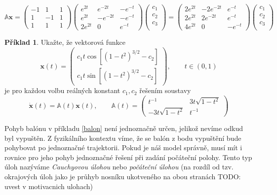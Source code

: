 \documentclass[a4paper, 12pt]{book}
\theoremstyle{definition}
\newtheorem{example}[theorem]{Příklad}
\def\vc#1{\mathbf{\boldsymbol{#1}}}     %
\def\tn#1{{\mathbb{#1}}}    %
\def\todo#1{{\color{green}TODO:} #1}
\begin{document}
\[
 \tn A\vc x =
 \begin{pmatrix}
  -1 & 1 &1\\
  1 &-1 &1\\
  1 &1 &1
 \end{pmatrix}
\begin{pmatrix}
e^{2t} &  e^{-2t}  & -  e^{-t}\\
e^{2t} &  -e^{-2t} & -  e^{-t}\\
2e^{2t} &  0        &    e^{-t}
\end{pmatrix}
\begin{pmatrix}
c_1\\
c_2\\
c_3\\
\end{pmatrix}
=
\begin{pmatrix}
2e^{2t} & -2 e^{-2t} & e^{-t}\\
2e^{2t} &  2 e^{-2t} & e^{-t}\\
4e^{2t} & 0          & -e^{-t}
\end{pmatrix}
\begin{pmatrix}
c_1\\
c_2\\
c_3\\
\end{pmatrix}
\]

\begin{example}
Ukažte, že vektorová funkce
\[
\vc x(t) = \begin{pmatrix}
c_1 t \cos [(1-t^2)^{3/2}-c_2]\\
c_1 t \sin [(1-t^2)^{3/2}-c_2]
\end{pmatrix}, \qquad t\in(0, 1)
\]
je pro každou volbu reálných konstant $c_1, c_2$ řešením soustavy
\[
\dot{\vc x}(t) = \tn A(t) \vc x(t),\qquad
\tn A(t)=\begin{pmatrix}
t^{-1}  &  3t\sqrt{1-t^2}\\
-3t\sqrt{1-t^2} & t^{-1}
\end{pmatrix}
\]
\end{example}

Pohyb balónu v příkladu \ref{balon} není jednoznačně určen, jelikož nevíme odkud byl vypuštěn. 
Z fyzikálního kontextu víme, že se balón z bodu vypuštění bude pohybovat po jednoznačné trajektorii. Pokud je 
náš model správně, musí mít i rovnice pro jeho pohyb jednoznačné řešení při zadání počáteční polohy. 
Tento typ úloh nazýváme {\it Cauchyovou úlohou} nebo {\it počáteční úlohou} 
(na rozdíl od tzv. okrajových úloh jako je průhyb nosníku ukotveného na obou stranách \todo{uvest v motivacnich ulohach})
\end{document}
